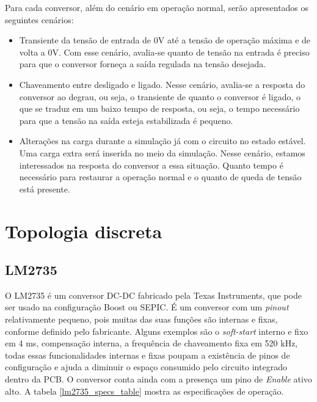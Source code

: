 Para cada conversor, além do cenário em operação normal, serão apresentados os seguintes cenários:
\begin{itemize}
    \item Transiente da tensão de entrada de 0V até a tensão de operação máxima e de volta a 0V. Com esse cenário, avalia-se quanto de tensão na entrada é preciso para que o conversor forneça a saída regulada na tensão desejada.
    \item Chaveamento entre desligado e ligado. Nesse cenário, avalia-se a resposta do conversor ao degrau, ou seja, o transiente de quanto o conversor é ligado, o que se traduz em um baixo tempo de resposta, ou seja, o tempo necessário para que a tensão na saída esteja estabilizada é pequeno.
    \item Alterações na carga durante a simulação já com o circuito no estado estável. Uma carga extra será inserida no meio da simulação. Nesse cenário, estamos interessados na resposta do conversor a essa situação. Quanto tempo é necessário para restaurar a operação normal e o quanto de queda de tensão está presente. 
\end{itemize}


\section{Topologia discreta}

\subsection*{LM2735}

\noindent
\begin{minipage}{\linewidth}
\label{fig:lm2735_stock}
\end{minipage}

O LM2735 \cite{lm2735_datasheet} é um conversor DC-DC fabricado pela Texas Instruments, que pode ser usado na configuração Boost ou SEPIC. É um conversor com um \textit{pinout} relativamente pequeno, pois muitas das suas funções são internas e fixas, conforme definido pelo fabricante. Alguns exemplos são o \textit{soft-start} interno e fixo em 4 ms, compensação interna, a frequência de chaveamento fixa em 520 kHz, todas essas funcionalidades internas e fixas poupam a existência de pinos de configuração e ajuda a diminuir o espaço consumido pelo circuito integrado dentro da PCB. O conversor conta ainda com a presença um pino de \textit{Enable} ativo alto. A tabela \ref{lm2735_specs_table} mostra as especificações de operação.

